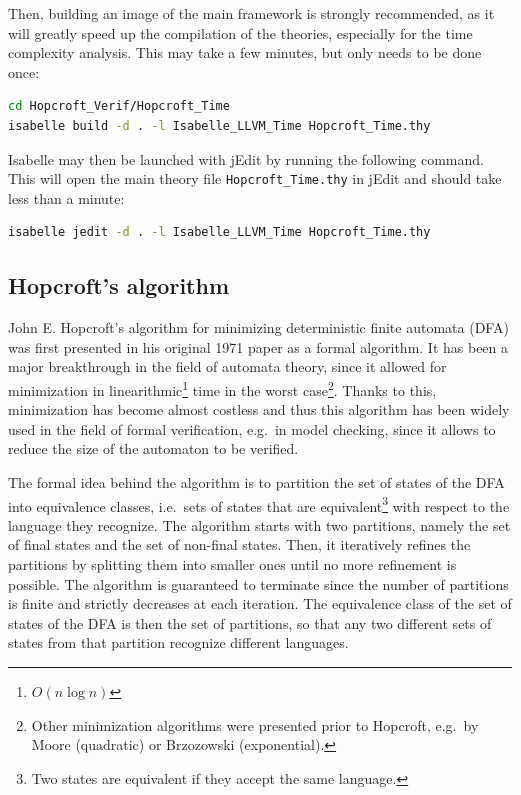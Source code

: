 \documentclass[12pt, a4 paper]{article}
\theoremstyle{definition}
\begin{document}
Then, building an image of the main framework is strongly recommended, as it will greatly speed up the compilation of the theories, especially for the time complexity analysis. This may take a few minutes, but only needs to be done once:
\begin{lstlisting}[language=bash]
cd Hopcroft_Verif/Hopcroft_Time
isabelle build -d . -l Isabelle_LLVM_Time Hopcroft_Time.thy
\end{lstlisting}

Isabelle may then be launched with jEdit by running the following command. This will open the main theory file \texttt{Hopcroft\_Time.thy} in jEdit and should take less than a minute:
\begin{lstlisting}[language=bash]
isabelle jedit -d . -l Isabelle_LLVM_Time Hopcroft_Time.thy
\end{lstlisting}

\subsection{Hopcroft's algorithm}
John E. Hopcroft's algorithm for minimizing deterministic finite automata (DFA) was first presented in his original 1971 paper \cite{Hop71} as a formal algorithm.
It has been a major breakthrough in the field of automata theory, since it allowed for minimization in linearithmic\footnote{$O(n \log n)$} time in the worst case\footnote{Other minimization algorithms were presented prior to Hopcroft, e.g.\ by Moore (quadratic) or Brzozowski (exponential).}.
Thanks to this, minimization has become almost costless and thus this algorithm has been widely used in the field of formal verification, e.g.\ in model checking, since it allows to reduce the size of the automaton to be verified.

The formal idea behind the algorithm is to partition the set of states of the DFA into equivalence classes, i.e.\ sets of states that are equivalent\footnote{Two states are equivalent if they accept the same language.} with respect to the language they recognize.
The algorithm starts with two partitions, namely the set of final states and the set of non-final states.
Then, it iteratively refines the partitions by splitting them into smaller ones until no more refinement is possible.
The algorithm is guaranteed to terminate since the number of partitions is finite and strictly decreases at each iteration.
The equivalence class of the set of states of the DFA is then the set of partitions, so that any two different sets of states from that partition recognize different languages.
\end{document}
